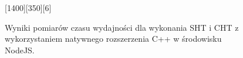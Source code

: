 

\begin{figure}[h]
     {

        \seqReferenceLookup
    }{

        \seqReferenceCircle
    }[1400][350][6]

    \caption{Wyniki pomiarów czasu wydajności dla wykonania SHT i CHT z wykorzystaniem natywnego rozszerzenia C++ w środowisku NodeJS.}
    \label{plot:cpu-addon}
\end{figure}
